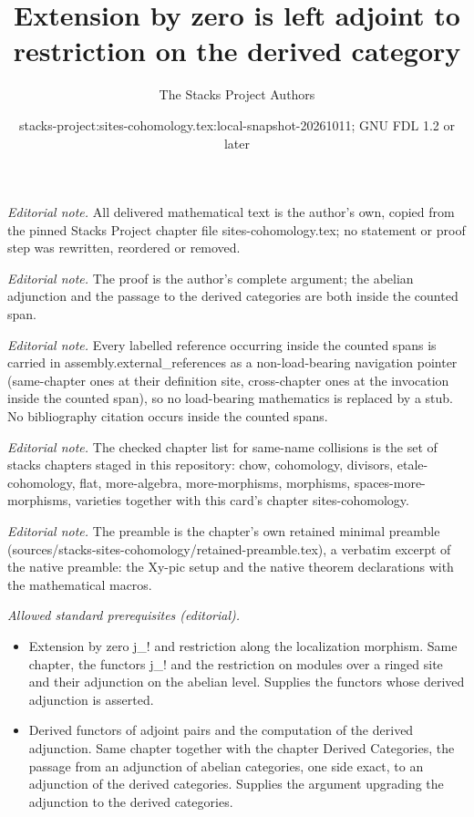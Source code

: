 \documentclass[10pt,a4paper]{amsart}
\title{Extension by zero is left adjoint to restriction on the derived category}
\author{The Stacks Project Authors}
\date{stacks-project:sites-cohomology.tex:local-snapshot-20261011; GNU FDL 1.2 or later}
\theoremstyle{plain}
\theoremstyle{definition}
\theoremstyle{remark}
\numberwithin{equation}{subsection}
\begin{document}
\maketitle
\noindent\textit{Editorial note.} All delivered mathematical text is the author's own, copied from the pinned Stacks Project chapter file sites-cohomology.tex; no statement or proof step was rewritten, reordered or removed.\par\medskip
\noindent\textit{Editorial note.} The proof is the author's complete argument; the abelian adjunction and the passage to the derived categories are both inside the counted span.\par\medskip
\noindent\textit{Editorial note.} Every labelled reference occurring inside the counted spans is carried in assembly.external\_references as a non-load-bearing navigation pointer (same-chapter ones at their definition site, cross-chapter ones at the invocation inside the counted span), so no load-bearing mathematics is replaced by a stub. No bibliography citation occurs inside the counted spans.\par\medskip
\noindent\textit{Editorial note.} The checked chapter list for same-name collisions is the set of stacks chapters staged in this repository: chow, cohomology, divisors, etale-cohomology, flat, more-algebra, more-morphisms, morphisms, spaces-more-morphisms, varieties together with this card's chapter sites-cohomology.\par\medskip
\noindent\textit{Editorial note.} The preamble is the chapter's own retained minimal preamble (sources/stacks-sites-cohomology/retained-preamble.tex), a verbatim excerpt of the native preamble: the Xy-pic setup and the native theorem declarations with the mathematical macros.\par\medskip
\noindent\textit{Allowed standard prerequisites (editorial).}\begin{itemize}
\item Extension by zero j\_! and restriction along the localization morphism. Same chapter, the functors j\_! and the restriction on modules over a ringed site and their adjunction on the abelian level. Supplies the functors whose derived adjunction is asserted.
\item Derived functors of adjoint pairs and the computation of the derived adjunction. Same chapter together with the chapter Derived Categories, the passage from an adjunction of abelian categories, one side exact, to an adjunction of the derived categories. Supplies the argument upgrading the adjunction to the derived categories.
\end{itemize}\medskip
\end{document}
